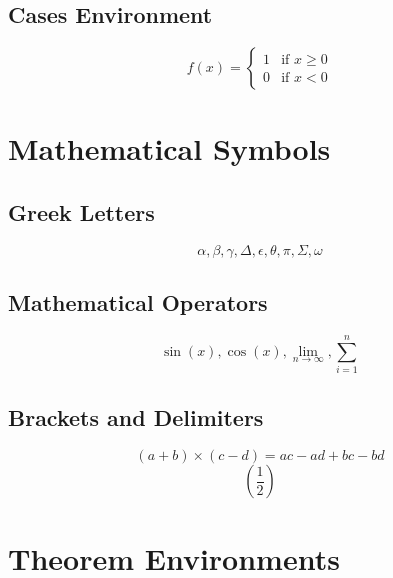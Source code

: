 \documentclass{article} %
\begin{document}
\subsection{Cases Environment} %
\[ %
f(x) = %
\begin{cases} %
    1 & \text{if } x \geq 0 \\ %
    0 & \text{if } x < 0 %
\end{cases} %
\] %

\section{Mathematical Symbols} %

\subsection{Greek Letters} %
\[ \alpha, \beta, \gamma, \Delta, \epsilon, \theta, \pi, \Sigma, \omega \] %

\subsection{Mathematical Operators} %
\[ \sin(x), \cos(x), \lim_{n \to \infty}, \sum_{i=1}^{n} \] %

\subsection{Brackets and Delimiters} %
\[ (a + b) \times (c - d) = ac - ad + bc - bd \] %
\[ \left( \frac{1}{2} \right) \] %

\section{Theorem Environments} %

\newtheorem{theorem}{Theorem} %
\end{document}
